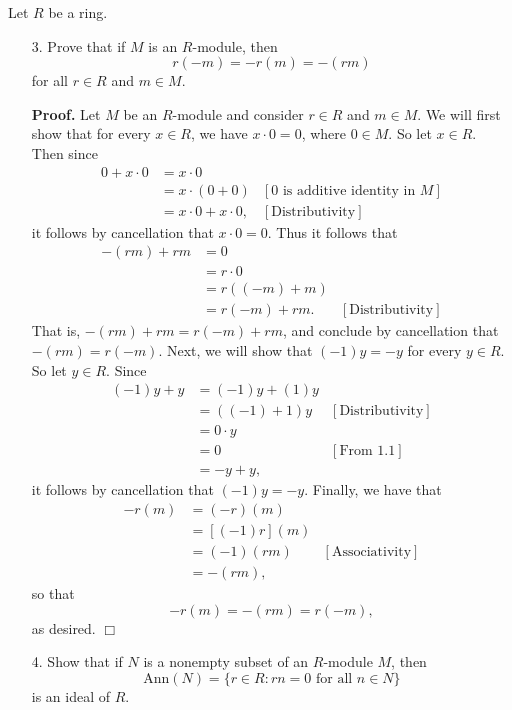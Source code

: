 \documentclass[9pt]{article}
\newcommand{\qed}{\hfill \ensuremath{\Box}}
\begin{document}
Let $R$ be a ring.
\begin{enumerate}
   \item[3.]   Prove that if $M$ is an $R$-module, then
               $$r(-m) = -r(m) = -(rm)$$
               for all $r \in R$ and $m \in M$.

      \textbf{Proof.} Let $M$ be an $R$-module and consider $r \in R$ and
      $m \in M$. We will first show that for every $x \in R$, we have
      $x \cdot 0 = 0$, where $0 \in M$. So let $x \in R$. Then since
      \begin{align*}
         0 + x \cdot 0 &= x \cdot 0 \\
                   &= x \cdot (0 + 0) &[0 \text{ is additive identity in }M] \\
                   &= x \cdot 0 + x \cdot 0, &[\text{Distributivity}]
      \end{align*}
      it follows by cancellation that $x \cdot 0 = 0$. Thus it follows that
      \begin{align*}
         -(rm) + rm &= 0 \\
           &= r \cdot 0 \\
           &=  r((-m) + m) \\
           &= r(-m) + rm. &[\text{Distributivity}]
      \end{align*}
      That is, $-(rm) + rm = r(-m) + rm$, and conclude by cancellation that
      $-(rm) = r(-m)$. Next, we will show that $(-1)y = -y$ for every $y \in R$.
      So let $y \in R$. Since
      \begin{align*}
         (-1)y + y &= (-1)y + (1)y \\
            &= ((-1) + 1)y &[\text{Distributivity}] \\
            &= 0 \cdot y \\
            &= 0 & [\text{From }1.1]\\
            &= -y + y,
      \end{align*}
      it follows by cancellation that $(-1)y = -y$. Finally, we have that
      \begin{align*}
         -r(m) &= (-r)(m) \\
               &= [(-1)r](m) \\
               &= (-1)(rm) &[\text{Associativity}] \\
               &= -(rm),
      \end{align*}
      so that
      $$-r(m) = -(rm) = r(-m),$$
      as desired. \qed
   \item[4.]   Show that if $N$ is a nonempty subset of an $R$-module $M$, then
               $$\text{Ann}({N}) = \{r \in R : rn = 0
                 \text{ for all }n \in N\}$$
               is an ideal of $R$.


\end{enumerate}
\end{document}
